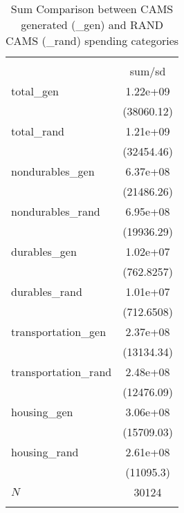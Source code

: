 \begin{table}[htbp]\centering
\def\sym#1{\ifmmode^{#1}\else\(^{#1}\)\fi}
\caption{Sum Comparison between CAMS generated (\_gen) and RAND CAMS (\_rand) spending categories }
\begin{tabular}{l*{1}{c}}
\hline\hline
            &\\
            &      sum/sd\\
\hline
total\_gen   &    1.22e+09\\
            &  (38060.12)\\
total\_rand  &    1.21e+09\\
            &  (32454.46)\\
nondurables\_gen&    6.37e+08\\
            &  (21486.26)\\
nondurables\_rand&    6.95e+08\\
            &  (19936.29)\\
durables\_gen&    1.02e+07\\
            &  (762.8257)\\
durables\_rand&    1.01e+07\\
            &  (712.6508)\\
transportation\_gen&    2.37e+08\\
            &  (13134.34)\\
transportation\_rand&    2.48e+08\\
            &  (12476.09)\\
housing\_gen &    3.06e+08\\
            &  (15709.03)\\
housing\_rand&    2.61e+08\\
            &   (11095.3)\\
\hline
\(N\)       &       30124\\
\hline\hline
{}\\
\end{tabular}
\end{table}
